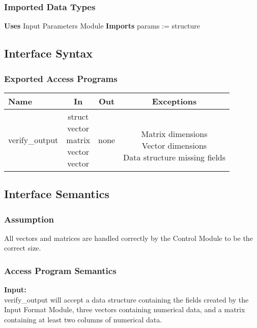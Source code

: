 \documentclass[12pt]{article}
\begin{document}
\subsubsection{Imported Data Types}
\textbf{Uses} Input Parameters Module \textbf{Imports} params := structure

\subsection{Interface Syntax}

\subsubsection{Exported Access Programs}

\begin{center}
	\begin{tabular}{l c c c}
		\hline
		\textbf{Name} & \textbf{In} & \textbf{Out} & \textbf{Exceptions} \\ \hline
		verify\_{output} & \shortstack{struct \\ vector \\ matrix \\ vector \\ vector} & none & \shortstack{\\ Matrix dimensions \\ Vector dimensions \\ Data structure missing fields}  \\
		\hline
	\end{tabular}
\end{center}

\subsection{Interface Semantics}

\subsubsection{Assumption}

All vectors and matrices are handled correctly by the Control Module to be the correct size.

\subsubsection{Access Program Semantics}

\noindent \textbf{Input:}\\
verify\_{output} will accept a data structure containing the fields created by the Input Format Module, three vectors containing numerical data, and a matrix containing at least two columns of numerical data.\\
\end{document}
